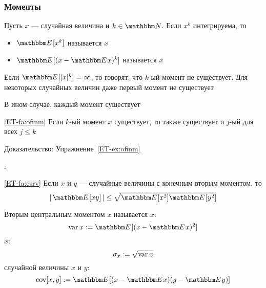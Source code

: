 \begin{frame}

    \frametitle{Моменты}
    
    \vspace{2em}
    
    Пусть $x$ --- случайная величина и $k \in \NN$. Если $x^k$ интегрируема, то 
    \begin{itemize}
        \item $\EE [x^k] $ называется  $x$
        \item $\EE [ (x - \EE x)^k]$ называется  $x$
    \end{itemize}
    Если $\EE [ |x|^k ] = \infty$, то говорят, что $k$-ый момент не существует. 
    Для некоторых случайных величин даже первый момент не существует
    
    \vspace{.7em}
    В ином случае, каждый момент существует
    
    \Fact\eqref{ET-fa:ofinm}
    Если $k$-ый момент $x$ существует, то также существует и $j$-ый для всех $j \leq k$
    
    Доказательство: Упражнение~\ref{ET-ex:ofinm}

\end{frame}

\begin{frame}

    \vspace{2em}
    :

    \vspace{1em}
    \Fact\eqref{ET-fa:csrv}
        Если $x$ и $y$ --- случайные величины с конечным вторым моментом, то
        \begin{equation}
            \label{eq:csrv}
            \left| \, \EE [xy] \, \right| \leq \sqrt{ \EE[x^2] \EE[y^2] }
        \end{equation}
\end{frame}

\begin{frame}

    \vspace{2em}
    Вторым центральным моментом $x$ называется  $x$:
    \begin{equation*}
        \var x := \EE [ (x - \EE x)^2 ]
    \end{equation*}
     $x$:
    \begin{equation*}
        \sigma_x := \sqrt{\operatorname{var} x}
    \end{equation*}
     случайной величины $x$ и $y$:
    \begin{equation*}
        \cov[x, y] := \EE [ (x - \EE x)(y - \EE y) ]
    \end{equation*}
    
\end{frame}


